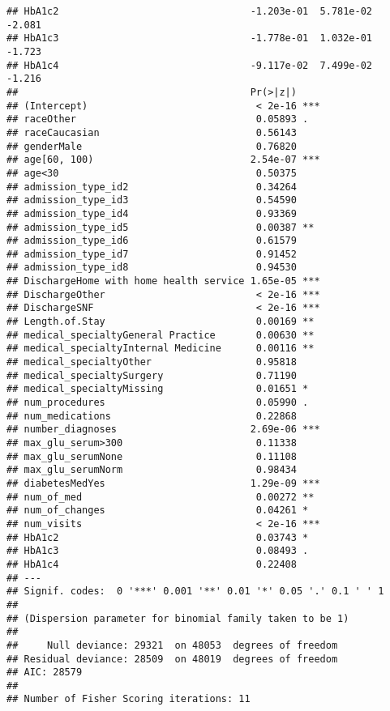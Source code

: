 \documentclass[
]{article}
\begin{document}
\begin{verbatim}
## HbA1c2                                 -1.203e-01  5.781e-02  -2.081
## HbA1c3                                 -1.778e-01  1.032e-01  -1.723
## HbA1c4                                 -9.117e-02  7.499e-02  -1.216
##                                        Pr(>|z|)    
## (Intercept)                             < 2e-16 ***
## raceOther                               0.05893 .  
## raceCaucasian                           0.56143    
## genderMale                              0.76820    
## age[60, 100)                           2.54e-07 ***
## age<30                                  0.50375    
## admission_type_id2                      0.34264    
## admission_type_id3                      0.54590    
## admission_type_id4                      0.93369    
## admission_type_id5                      0.00387 ** 
## admission_type_id6                      0.61579    
## admission_type_id7                      0.91452    
## admission_type_id8                      0.94530    
## DischargeHome with home health service 1.65e-05 ***
## DischargeOther                          < 2e-16 ***
## DischargeSNF                            < 2e-16 ***
## Length.of.Stay                          0.00169 ** 
## medical_specialtyGeneral Practice       0.00630 ** 
## medical_specialtyInternal Medicine      0.00116 ** 
## medical_specialtyOther                  0.95818    
## medical_specialtySurgery                0.71190    
## medical_specialtyMissing                0.01651 *  
## num_procedures                          0.05990 .  
## num_medications                         0.22868    
## number_diagnoses                       2.69e-06 ***
## max_glu_serum>300                       0.11338    
## max_glu_serumNone                       0.11108    
## max_glu_serumNorm                       0.98434    
## diabetesMedYes                         1.29e-09 ***
## num_of_med                              0.00272 ** 
## num_of_changes                          0.04261 *  
## num_visits                              < 2e-16 ***
## HbA1c2                                  0.03743 *  
## HbA1c3                                  0.08493 .  
## HbA1c4                                  0.22408    
## ---
## Signif. codes:  0 '***' 0.001 '**' 0.01 '*' 0.05 '.' 0.1 ' ' 1
## 
## (Dispersion parameter for binomial family taken to be 1)
## 
##     Null deviance: 29321  on 48053  degrees of freedom
## Residual deviance: 28509  on 48019  degrees of freedom
## AIC: 28579
## 
## Number of Fisher Scoring iterations: 11
\end{verbatim}
\end{document}
